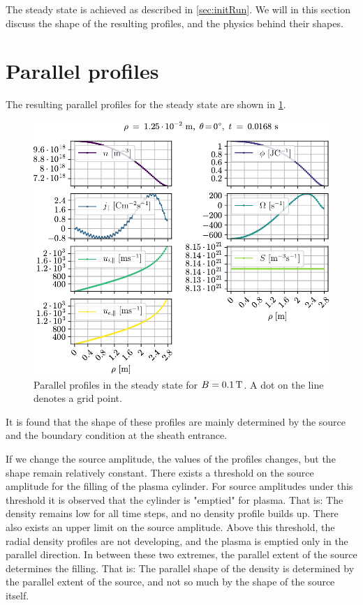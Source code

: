 The steady state is achieved as described in \cref{sec:initRun}.
We will in this section discuss the shape of the resulting profiles, and the physics behind their shapes.

\section{Parallel profiles}
%
The resulting parallel profiles for the steady state are shown in \cref{fig:parProfs}.
%
\begin{figure}[htb]
    \centering
    \includegraphics{fig/results/1DProfiles/B010Par}
    \caption{Parallel profiles in the steady state for $B=0.1\, \text{T}$.
        A dot on the line denotes a grid point.}
    \label{fig:parProfs}
\end{figure}
%
It is found that the shape of these profiles are mainly determined by the source and the boundary condition at the sheath entrance.

If we change the source amplitude, the values of the profiles changes, but the shape remain relatively constant.
There exists a threshold on the source amplitude for the filling of the plasma cylinder.
For source amplitudes under this threshold it is observed that the cylinder is "emptied" for plasma.
That is: The density remains low for all time steps, and no density profile builds up.
There also exists an upper limit on the source amplitude.
Above this threshold, the radial density profiles are not developing, and the plasma is emptied only in the parallel direction.
In between these two extremes, the parallel extent of the source determines the filling.
That is: The parallel shape of the density is determined by the parallel extent of the source, and not so much by the shape of the source itself.

